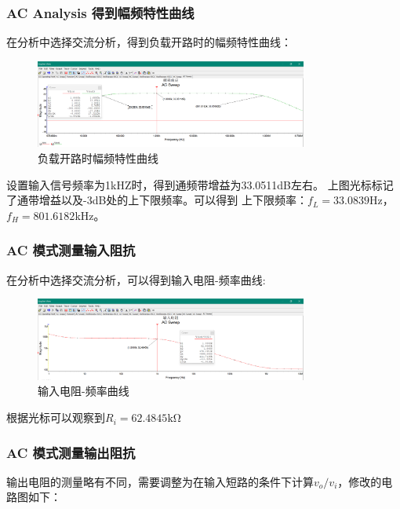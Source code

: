 \documentclass[a4paper,11pt,UTF8]{article}
\numberwithin{equation}{subsection}
\begin{document}
\subsubsection{AC Analysis 得到幅频特性曲线}
在分析中选择交流分析，得到负载开路时的幅频特性曲线：
\begin{figure}[H]
	\centering
	\includegraphics[width=0.8\textwidth]{2.7.png}	
	\caption{负载开路时幅频特性曲线}
\end{figure}

设置输入信号频率为1kHZ时，得到通频带增益为33.0511dB左右。
上图光标标记了通带增益以及-3dB处的上下限频率。可以得到
上下限频率：$f_L=33.0839$Hz，$f_H=801.6182$kHz。

\subsubsection{AC 模式测量输入阻抗}
在分析中选择交流分析，可以得到输入电阻-频率曲线:

\begin{figure}[H]
	\centering
	\includegraphics[width=0.8\textwidth]{2.8.png}	
	\caption{输入电阻-频率曲线}
\end{figure}

根据光标可以观察到$R_i=62.4845\mathrm{k\Omega}$

\subsubsection{AC 模式测量输出阻抗}
输出电阻的测量略有不同，需要调整为在输入短路的条件下计算$v_o/v_i$，修改的电路图如下：
\end{document}
